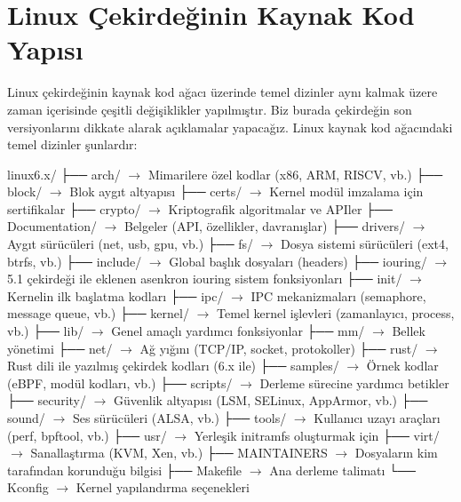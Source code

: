 \documentclass[a4paper,10pt,turkish]{sphinxmanual}
\begin{document}
\sphinxAtStartPar
{}


\section{Linux Çekirdeğinin Kaynak Kod Yapısı}
\label{\detokenize{introduction:linux-cekirdeginin-kaynak-kod-yapisi}}
\sphinxAtStartPar
Linux çekirdeğinin kaynak kod ağacı üzerinde temel dizinler aynı kalmak üzere zaman
içerisinde çeşitli değişiklikler yapılmıştır. Biz burada çekirdeğin son versiyonlarını
dikkate alarak açıklamalar yapacağız. Linux kaynak kod ağacındaki temel dizinler şunlardır:

\begin{sphinxVerbatim}[commandchars=\\\{\}]
linux\PYGZhy{}6.x/
├── arch/          \(\rightarrow\) Mimarilere özel kodlar (x86, ARM, RISC\PYGZhy{}V, vb.)
├── block/         \(\rightarrow\) Blok aygıt altyapısı
├── certs/         \(\rightarrow\) Kernel modül imzalama için sertifikalar
├── crypto/        \(\rightarrow\) Kriptografik algoritmalar ve API\PYGZsq{}ler
├── Documentation/ \(\rightarrow\) Belgeler (API, özellikler, davranışlar)
├── drivers/       \(\rightarrow\) Aygıt sürücüleri (net, usb, gpu, vb.)
├── fs/            \(\rightarrow\) Dosya sistemi sürücüleri (ext4, btrfs, vb.)
├── include/       \(\rightarrow\) Global başlık dosyaları (headers)
├── io\PYGZus{}uring/      \(\rightarrow\) 5.1 çekirdeği ile eklenen asenkron io\PYGZus{}uring sistem fonksiyonları
├── init/          \(\rightarrow\) Kernelin ilk başlatma kodları
├── ipc/           \(\rightarrow\) IPC mekanizmaları (semaphore, message queue, vb.)
├── kernel/        \(\rightarrow\) Temel kernel işlevleri (zamanlayıcı, process, vb.)
├── lib/           \(\rightarrow\) Genel amaçlı yardımcı fonksiyonlar
├── mm/            \(\rightarrow\) Bellek yönetimi
├── net/           \(\rightarrow\) Ağ yığını (TCP/IP, socket, protokoller)
├── rust/          \(\rightarrow\) Rust dili ile yazılmış çekirdek kodları (6.x ile)
├── samples/       \(\rightarrow\) Örnek kodlar (eBPF, modül kodları, vb.)
├── scripts/       \(\rightarrow\) Derleme sürecine yardımcı betikler
├── security/      \(\rightarrow\) Güvenlik altyapısı (LSM, SELinux, AppArmor, vb.)
├── sound/         \(\rightarrow\) Ses sürücüleri (ALSA, vb.)
├── tools/         \(\rightarrow\) Kullanıcı uzayı araçları (perf, bpftool, vb.)
├── usr/           \(\rightarrow\) Yerleşik initramfs oluşturmak için
├── virt/          \(\rightarrow\) Sanallaştırma (KVM, Xen, vb.)
├── MAINTAINERS    \(\rightarrow\) Dosyaların kim tarafından korunduğu bilgisi
├── Makefile       \(\rightarrow\) Ana derleme talimatı
└── Kconfig        \(\rightarrow\) Kernel yapılandırma seçenekleri
\end{sphinxVerbatim}
\end{document}
